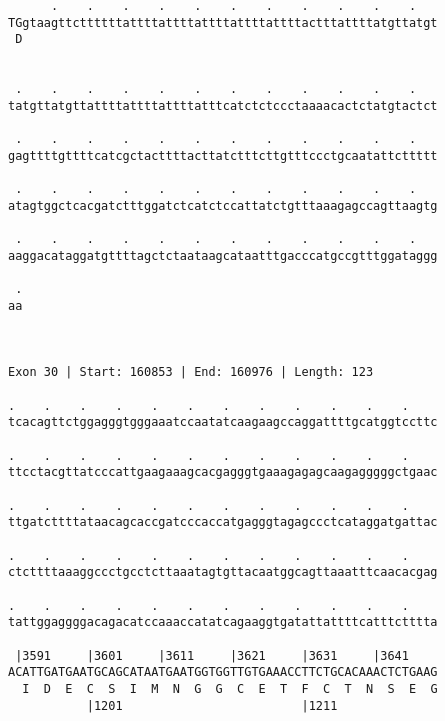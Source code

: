 \documentclass{article}
\begin{document}
\begin{Verbatim}
      .    .    .    .    .    .    .    .    .    .    .   
TGgtaagttcttttttattttattttattttattttattttactttattttatgttatgt
 D                                                          
                                                            
  
 .    .    .    .    .    .    .    .    .    .    .    .   
tatgttatgttattttattttattttatttcatctctccctaaaacactctatgtactct
                                                            
 .    .    .    .    .    .    .    .    .    .    .    .   
gagttttgttttcatcgctacttttacttatctttcttgtttccctgcaatattcttttt
                                                            
 .    .    .    .    .    .    .    .    .    .    .    .   
atagtggctcacgatctttggatctcatctccattatctgtttaaagagccagttaagtg
                                                            
 .    .    .    .    .    .    .    .    .    .    .    .   
aaggacataggatgttttagctctaataagcataatttgacccatgccgtttggataggg
                                                            
 .
aa
  
  
 
Exon 30 | Start: 160853 | End: 160976 | Length: 123
 
.    .    .    .    .    .    .    .    .    .    .    .    
tcacagttctggagggtgggaaatccaatatcaagaagccaggattttgcatggtccttc
                                                            
.    .    .    .    .    .    .    .    .    .    .    .    
ttcctacgttatcccattgaagaaagcacgagggtgaaagagagcaagagggggctgaac
                                                            
.    .    .    .    .    .    .    .    .    .    .    .    
ttgatcttttataacagcaccgatcccaccatgagggtagagccctcataggatgattac
                                                            
.    .    .    .    .    .    .    .    .    .    .    .    
ctcttttaaaggccctgcctcttaaatagtgttacaatggcagttaaatttcaacacgag
                                                            
.    .    .    .    .    .    .    .    .    .    .    .    
tattggaggggacagacatccaaaccatatcagaaggtgatattattttcatttctttta
                                                            
 |3591     |3601     |3611     |3621     |3631     |3641    
ACATTGATGAATGCAGCATAATGAATGGTGGTTGTGAAACCTTCTGCACAAACTCTGAAG
  I  D  E  C  S  I  M  N  G  G  C  E  T  F  C  T  N  S  E  G
           |1201                         |1211              
  

\end{Verbatim}
\end{document}
